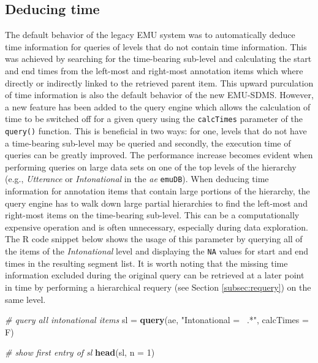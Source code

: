 \documentclass[]{book}
\newenvironment{Shaded}{\begin{snugshade}}{\end{snugshade}}
\newcommand{\CommentTok}[1]{\textcolor[rgb]{0.56,0.35,0.01}{\textit{#1}}}
\newcommand{\DataTypeTok}[1]{\textcolor[rgb]{0.13,0.29,0.53}{#1}}
\newcommand{\DecValTok}[1]{\textcolor[rgb]{0.00,0.00,0.81}{#1}}
\newcommand{\KeywordTok}[1]{\textcolor[rgb]{0.13,0.29,0.53}{\textbf{#1}}}
\newcommand{\NormalTok}[1]{#1}
\newcommand{\StringTok}[1]{\textcolor[rgb]{0.31,0.60,0.02}{#1}}
\begin{document}
\hypertarget{subsec:query_deducingTime}{%
\subsection{Deducing time}\label{subsec:query_deducingTime}}

The default behavior of the legacy EMU system was to automatically deduce time information for queries of levels that do not contain time information. This was achieved by searching for the time-bearing sub-level and calculating the start and end times from the left-most and right-most annotation items which where directly or indirectly linked to the retrieved parent item. This upward purculation of time information is also the default behavior of the new EMU-SDMS. However, a new feature has been added to the query engine which allows the calculation of time to be switched off for a given query using the \texttt{calcTimes} parameter of the \texttt{query()} function. This is beneficial in two ways: for one, levels that do not have a time-bearing sub-level may be queried and secondly, the execution time of queries can be greatly improved. The performance increase becomes evident when performing queries on large data sets on one of the top levels of the hierarchy (e.g., \emph{Utterance} or \emph{Intonational} in the \emph{ae} \texttt{emuDB}). When deducing time information for annotation items that contain large portions of the hierarchy, the query engine has to walk down large partial hierarchies to find the left-most and right-most items on the time-bearing sub-level. This can be a computationally expensive operation and is often unnecessary, especially during data exploration. The R code snippet below shows the usage of this parameter by querying all of the items of the \emph{Intonational} level and displaying the \texttt{NA} values for start and end times in the resulting segment list. It is worth noting that the missing time information excluded during the original query can be retrieved at a later point in time by performing a hierarchical requery (see Section \ref{subsec:requery}) on the same level.

\begin{Shaded}
\begin{Highlighting}[]
\CommentTok{# query all intonational items}
\NormalTok{sl =}\StringTok{ }\KeywordTok{query}\NormalTok{(ae, }\StringTok{"Intonational =~ .*"}\NormalTok{, }\DataTypeTok{calcTimes =}\NormalTok{ F)}

 \CommentTok{# show first entry of sl}
\KeywordTok{head}\NormalTok{(sl, }\DataTypeTok{n =} \DecValTok{1}\NormalTok{)}
\end{Highlighting}
\end{Shaded}
\end{document}
